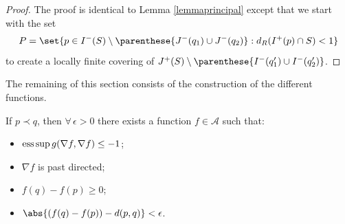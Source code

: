 \begin{proof}
The proof is identical to Lemma \ref{lemmaprincipal} except that we start with the set \[
P = \set{ p \in I^-(S) \setminus \parenthese{J^-(q_1) \cup J^-(q_2)} : d_R(I^+(p) \cap S) < 1}
\]
to create a locally f\/inite covering of $J^+(S) \setminus \parenthese{ I^-(q_1') \cup I^-(q_2') }$.
\end{proof}

The remaining of this section consists of the construction of the dif\/ferent functions.

\begin{lemma}\label{equality}
If $p \prec q$, then $\forall\, \epsilon > 0$ there exists a function $f\in \mathcal A$ such that:
\begin{itemize}
\item $\text{\rm ess} \sup g( \nabla f, \nabla f ) \leq -1$;
\item $\nabla f$ is past directed;
\item $f(q)-f(p) \geq 0$;
\item $\abs{(f(q)-f(p)) - d(p,q)} < \epsilon$.
\end{itemize}

\end{lemma}

